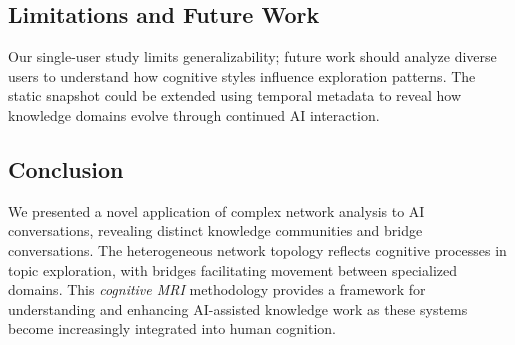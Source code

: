 \documentclass{svproc}
\begin{document}
\subsection{Limitations and Future Work}

Our single-user study limits generalizability; future work should analyze diverse users to understand how cognitive styles influence exploration patterns. The static snapshot could be extended using temporal metadata to reveal how knowledge domains evolve through continued AI interaction.

\subsection{Conclusion}

We presented a novel application of complex network analysis to AI conversations, revealing distinct knowledge communities and bridge conversations. The heterogeneous network topology reflects cognitive processes in topic exploration, with bridges facilitating movement between specialized domains. This \emph{cognitive MRI} methodology provides a framework for understanding and enhancing AI-assisted knowledge work as these systems become increasingly integrated into human cognition.
\end{document}
